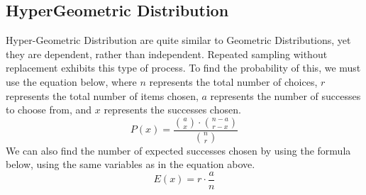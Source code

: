     \subsection{Hyper\textemdash Geometric Distribution}
    Hyper-Geometric Distribution are quite similar to Geometric Distributions, yet they are dependent, rather than independent.
    Repeated sampling without replacement exhibits this type of process.
    To find the probability of this, we must use the equation below, where $n$ represents the total number of choices,
    $r$ represents the total number of items chosen,
    $a$ represents the number of successes to choose from, and
    $x$ represents the successes chosen.\\
    \begin{equation*}
        P(x) = \frac{\binom{a}{x}\cdot \binom{n-a}{r-x}}{\binom{n}{r}}
    \end{equation*}
    We can also find the number of expected successes chosen by using the formula below, using the same variables as in the equation above.
    \begin{equation*}
        E(x) = r \cdot \frac{a}{n}
    \end{equation*}